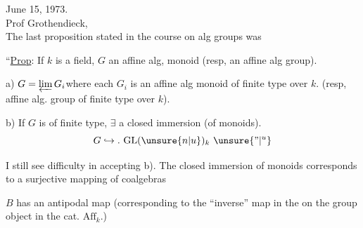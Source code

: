 \hfill June 15, 1973.\\
Prof Grothendieck,\\

The last proposition stated in the course on alg groups was\unsure{\textsuperscript{-}|\textsuperscript{,}}

``\uline{Prop}: If $k$ is a field, $G$ an affine alg, monoid (resp, an affine alg group).

a) $G=\varprojlim G_i$\qquad where each $G_i$ is an affine alg monoid of finite type over $k$. (resp, affine alg. group of finite type over $k$).

b) If $G$ is of finite type, $\exists$ a closed immersion (of monoids).
\[
G\hookrightarrow.\ \mathrm{GL}(\unsure{n|u})_k\ \unsure{\text{''}|{}^{u}}
\]

I still see difficulty in accepting b). The closed immersion of monoids corresponds to a surjective mapping of coalgebras

$B$ has an antipodal map (corresponding to the ``inverse'' map in the on the group object in the cat. $\mathrm{Aff}_k$.)
\clearpage
